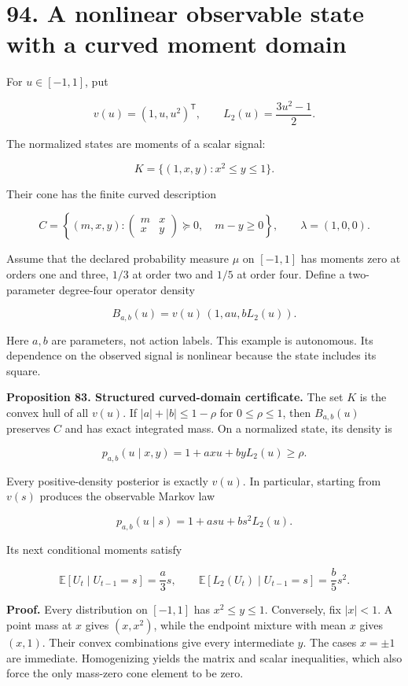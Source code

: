 \documentclass[11pt,letterpaper]{article}
\begin{document}
\section{94. A nonlinear observable state with a curved moment
domain}\label{a-nonlinear-observable-state-with-a-curved-moment-domain}

For \(u\in[-1,1]\), put

\[
v(u)=(1,u,u^2)^{\mathsf T},
\qquad L_2(u)=\frac{3u^2-1}{2}.
\]

The normalized states are moments of a scalar signal:

\[
K=\{(1,x,y):x^2\leq y\leq1\}.
\]

Their cone has the finite curved description

\[
C=\left\{(m,x,y):
\begin{pmatrix}m&x\\x&y\end{pmatrix}\succeq0,
\quad m-y\geq0\right\},
\qquad\lambda=(1,0,0).
\]

Assume that the declared probability measure \(\mu\) on \([-1,1]\) has
moments zero at orders one and three, \(1/3\) at order two and \(1/5\)
at order four. Define a two-parameter degree-four operator density

\[
\boxed{
B_{a,b}(u)=v(u)\,(1,au,bL_2(u)).
}
\]

Here \(a,b\) are parameters, not action labels. This example is
autonomous. Its dependence on the observed signal is nonlinear because
the state includes its square.

\textbf{Proposition 83. Structured curved-domain certificate.} The set
\(K\) is the convex hull of all \(v(u)\). If \(|a|+|b|\leq1-\rho\) for
\(0\leq\rho\leq1\), then \(B_{a,b}(u)\) preserves \(C\) and has exact
integrated mass. On a normalized state, its density is

\[
p_{a,b}(u\mid x,y)=1+a x u+b yL_2(u)\geq\rho.
\]

Every positive-density posterior is exactly \(v(u)\). In particular,
starting from \(v(s)\) produces the observable Markov law

\[
p_{a,b}(u\mid s)=1+a s u+b s^2L_2(u).
\]

Its next conditional moments satisfy

\[
\boxed{
\mathbb E[U_t\mid U_{t-1}=s]=\frac a3s,
\qquad
\mathbb E[L_2(U_t)\mid U_{t-1}=s]=\frac b5s^2.
}
\]

\textbf{Proof.} Every distribution on \([-1,1]\) has \(x^2\leq y\leq1\).
Conversely, fix \(|x|<1\). A point mass at \(x\) gives \((x,x^2)\),
while the endpoint mixture with mean \(x\) gives \((x,1)\). Their convex
combinations give every intermediate \(y\). The cases \(x=\pm1\) are
immediate. Homogenizing yields the matrix and scalar inequalities, which
also force the only mass-zero cone element to be zero.
\end{document}
